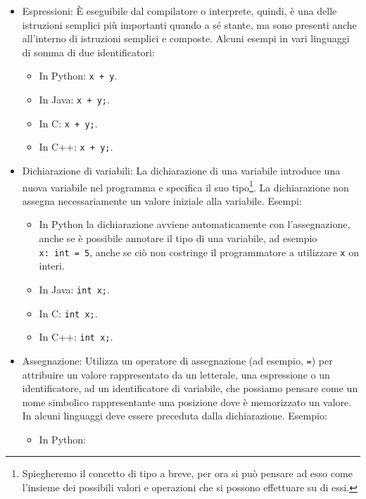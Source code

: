 \documentclass[
  letterpaper,
]{scrbook}
\providecommand{\tightlist}{%
  \setlength{\itemsep}{0pt}\setlength{\parskip}{0pt}}\usepackage{longtable,booktabs,array}
\begin{document}
\begin{itemize}
\item
  Espressioni: È eseguibile dal compilatore o interprete, quindi, è una
  delle istruzioni semplici più importanti quando a sé stante, ma sono
  presenti anche all'interno di istruzioni semplici e composte. Alcuni
  esempi in vari linguaggi di somma di due identificatori:

  \begin{itemize}
  \tightlist
  \item
    In Python: \texttt{x\ +\ y}.
  \item
    In Java: \texttt{x\ +\ y;}.
  \item
    In C: \texttt{x\ +\ y;}.
  \item
    In C++: \texttt{x\ +\ y;}.
  \end{itemize}
\item
  Dichiarazione di variabili: La dichiarazione di una variabile
  introduce una nuova variabile nel programma e specifica il suo
  tipo\footnote{Spiegheremo il concetto di tipo a breve, per ora si può
    pensare ad esso come l'insieme dei possibili valori e operazioni che
    si possono effettuare su di essi.}. La dichiarazione non assegna
  necessariamente un valore iniziale alla variabile. Esempi:

  \begin{itemize}
  \tightlist
  \item
    In Python la dichiarazione avviene automaticamente con
    l'assegnazione, anche se è possibile annotare il tipo di una
    variabile, ad esempio \texttt{x:\ int\ =\ 5}, anche se ciò non
    costringe il programmatore a utilizzare \texttt{x} on interi.
  \item
    In Java: \texttt{int\ x;}.
  \item
    In C: \texttt{int\ x;}.
  \item
    In C++: \texttt{int\ x;}.
  \end{itemize}
\item
  Assegnazione: Utilizza un operatore di assegnazione (ad esempio,
  \texttt{=}) per attribuire un valore rappresentato da un letterale,
  una espressione o un identificatore, ad un identificatore di
  variabile, che possiamo pensare come un nome simbolico rappresentante
  una posizione dove è memorizzato un valore. In alcuni linguaggi deve
  essere preceduta dalla dichiarazione. Esempio:

  \begin{itemize}
  \item
    In Python:


\end{itemize}
\end{itemize}
\end{document}

